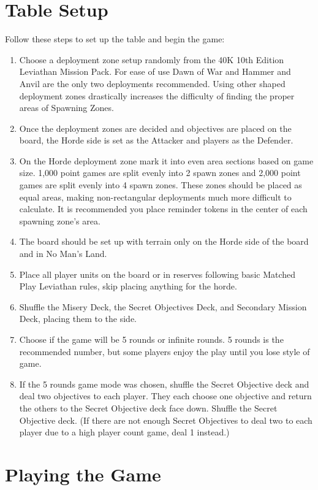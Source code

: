 \documentclass{HordeModeTarot}
\begin{document}
\section{Table Setup}
Follow these steps to set up the table and begin the game:
\begin{enumerate}
\item Choose a deployment zone setup randomly from the 40K 10th Edition Leviathan Mission Pack.  For ease of use Dawn of War and Hammer and Anvil are the only two deployments recommended. Using other shaped deployment zones drastically increases the difficulty of finding the proper areas of Spawning Zones.
\item Once the deployment zones are decided and objectives are placed on the board, the Horde side is set as the Attacker and players as the Defender.
\item On the Horde deployment zone mark it into even area sections based on game size.  1,000 point games are split evenly into 2 spawn zones and 2,000 point games are split evenly into 4 spawn zones.  These zones should be placed as equal areas, making non-rectangular deployments much more difficult to calculate. It is recommended you place reminder tokens in the center of each spawning zone’s area.
\item The board should be set up with terrain only on the Horde side of the board and in No Man’s Land.
\item Place all player units on the board or in reserves following basic Matched Play Leviathan rules, skip placing anything for the horde.
\item Shuffle the Misery Deck, the Secret Objectives Deck, and Secondary Mission Deck, placing them to the side.
\item Choose if the game will be 5 rounds or infinite rounds.  5 rounds is the recommended number, but some players enjoy the play until you lose style of game.
\item If the 5 rounds game mode was chosen, shuffle the Secret Objective deck and deal two objectives to each player. They each choose one objective and return the others to the Secret Objective deck face down.  Shuffle the Secret Objective deck.  (If there are not enough Secret Objectives to deal two to each player due to a high player count game, deal 1 instead.)
\end{enumerate}

\section{Playing the Game}
\end{document}
